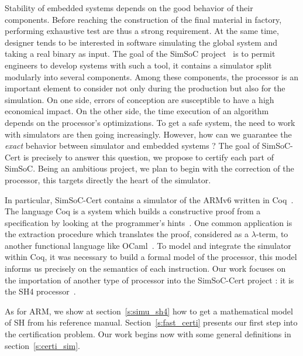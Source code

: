 \documentclass[a4paper, 11pt]{article}
\newcommand{\simsoc}{SimSoC\xspace}
\newcommand{\SScert}{SimSoC-Cert\xspace}
\begin{document}
Stability of embedded systems depends on the good behavior of their components. Before reaching the construction of the final material in factory, performing exhaustive test are thus a strong requirement. At the same time, designer tends to be interested in software simulating the global system and taking a real binary as input. The goal of the \simsoc project~\cite{ossc09} is to permit engineers to develop systems with such a tool, it contains a simulator split modularly into several components. Among these components, the processor is an important element to consider not only during the production but also for the simulation. On one side, errors of conception are susceptible to have a high economical impact. On the other side, the time execution of an algorithm depends on the processor's optimizations. To get a safe system, the need to work with simulators are then going increasingly. However, how can we guarantee the \emph{exact} behavior between simulator and embedded systems ? 
The goal of \SScert is precisely to answer this question, we propose to certify each part of \simsoc. Being an ambitious project, we plan to begin with the correction of the processor, this targets directly the heart of the simulator.

In particular, \SScert contains a simulator of the ARMv6 written in Coq~\cite{arm6refman, arm}. The language Coq is a system which builds a constructive proof from a specification by looking at the programmer's hints~\cite{Coq:manual}. One common application is the extraction procedure which translates the proof, considered as a $\lambda$-term, to another functional language like OCaml~\cite{OCaml}. To model and integrate the simulator within Coq, it was necessary to build a formal model of the processor, this model informs us precisely on the semantics of each instruction.
Our work focuses on the importation of another type of processor into the \SScert project : it is the SH4 processor~\cite{sh4refman}. 

As for ARM, we show at section~\ref{s:simu_sh4} how to get a mathematical model of SH from his reference manual. Section~\ref{s:fast_certi} presents our first step into the certification problem. Our work begins now with some general definitions in section~\ref{s:certi_sim}.
\end{document}

